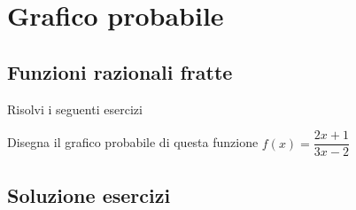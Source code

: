 \chapter{Grafico probabile}
\section{Funzioni razionali fratte}
Risolvi i seguenti esercizi
\tcbstartrecording


\begin{exercise}[no solution]
Disegna il grafico probabile di questa funzione $f(x)= \dfrac{2x+1}{3x-2}$
\end{exercise}
\tcbstoprecording
\newpage
\section{Soluzione esercizi}
\tcbinputrecords
